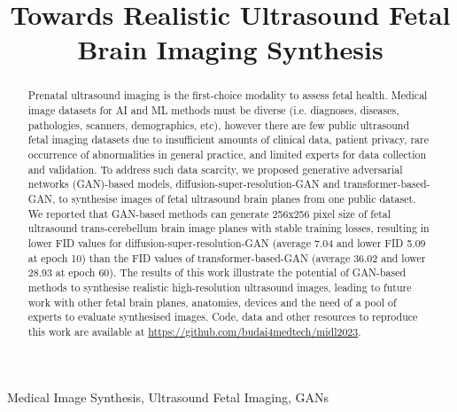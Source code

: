 \documentclass{midl} %
\title[
Towards Realistic High-Resolution Ultrasound Fetal Brain Imaging Synthesis %
]{
Towards Realistic Ultrasound Fetal Brain Imaging Synthesis %
}
\begin{document}
\maketitle

\begin{abstract}
Prenatal ultrasound imaging is the first-choice modality to assess fetal health.
Medical image datasets for AI and ML methods must be diverse (i.e. diagnoses, diseases, pathologies, scanners, demographics, etc), however there are few public ultrasound fetal imaging datasets due to insufficient amounts of clinical data, patient privacy, rare occurrence of abnormalities in general practice, and limited experts for data collection and validation.
To address such data scarcity, we proposed generative adversarial networks (GAN)-based models, diffusion-super-resolution-GAN and transformer-based-GAN, to synthesise images of fetal ultrasound brain planes from one public dataset.
We reported that GAN-based methods can generate 256x256 pixel size of fetal ultrasound trans-cerebellum brain image planes with stable training losses, resulting in lower FID values for diffusion-super-resolution-GAN (average 7.04 and lower FID 5.09 at epoch 10) than the FID values of transformer-based-GAN (average 36.02 and lower 28.93 at epoch 60).
The results of this work illustrate the potential of GAN-based methods to synthesise realistic high-resolution ultrasound images, leading to future work with other fetal brain planes, anatomies, devices and the need of a pool of experts to evaluate synthesised images.
Code, data and other resources to reproduce this work are available at \url{https://github.com/budai4medtech/midl2023}.
\end{abstract}

\begin{keywords}
Medical Image Synthesis, Ultrasound Fetal Imaging, GANs
\end{keywords}
\end{document}
